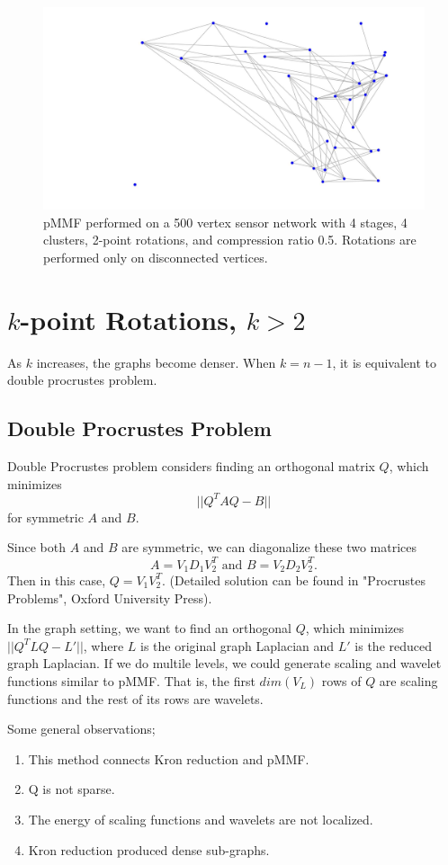 \documentclass[a4paper]{article}
\begin{document}
\begin{figure}[H]
\includegraphics[width = 7 cm]{disconnected_pMMF/discon_5}

\caption{pMMF performed on a 500 vertex sensor network with 4 stages, 4 clusters, 2-point rotations, and compression ratio 0.5. Rotations are performed only on disconnected vertices.}
\end{figure}

\section{$k$-point Rotations, $k>2$}
As $k$ increases, the graphs become denser. When $k = n-1$, it is equivalent to double procrustes problem.
\subsection{Double Procrustes Problem}

Double Procrustes problem considers finding an orthogonal matrix $Q$, which minimizes $$||Q^TAQ-B||$$ for symmetric $A$ and $B$. 

Since both $A$ and $B$ are symmetric, we can diagonalize these two matrices
$$ A = V_1D_1V_2^T\text{ and } B = V_2D_2V_2^T.$$
Then in this case, $Q = V_1 V_2^T$. (Detailed solution can be found in "Procrustes Problems", Oxford University Press). 

In the graph setting, we want to find an orthogonal $Q$, which minimizes $||Q^TLQ - L'||$, where $L$ is the original graph Laplacian and $L'$ is the reduced graph Laplacian. If we do multile levels, we could generate scaling and wavelet functions similar to pMMF. That is, the first $dim(V_L)$ rows of $Q$ are scaling functions and the rest of its rows are wavelets.

Some general observations;
\begin{enumerate}
\item This method connects Kron reduction and pMMF.
\item Q is not sparse.
\item The energy of scaling functions and wavelets are not localized.
\item Kron reduction produced dense sub-graphs.
\end{enumerate}
\end{document}
